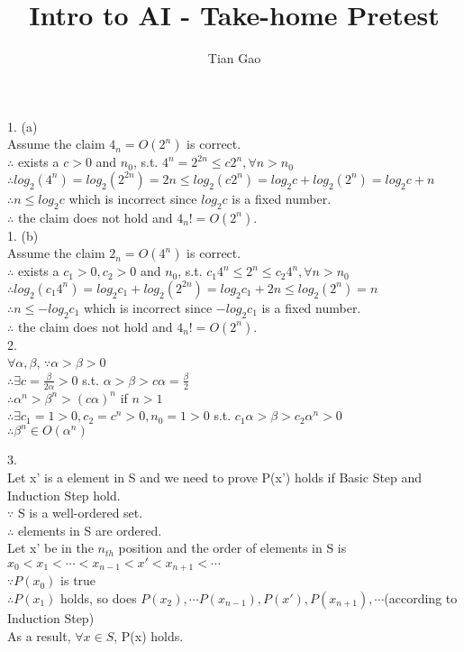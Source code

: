 \documentclass[a4paper]{article}
\title{Intro to AI - Take-home Pretest}
\author{Tian Gao}
\begin{document}
\maketitle


1. (a)\\
Assume the claim $4_n=O(2^n)$ is correct. \\
$\therefore$ exists a $c>0$ and $n_0$, s.t. $4^n = 2^{2n} \leqslant c  2^n, \forall n>n_0$\\
$\therefore log_2(4^{n}) = log_2(2^{2n})=2n \leqslant log_2(c  2^n) = log_2c + log_2(2^{n}) = log_2c + n$ \\
$\therefore n \leqslant log_2c$ which is incorrect since $log_2c$ is a fixed number.\\
$\therefore$ the claim does not hold and $4_n!=O(2^n)$.\\

1. (b)\\
Assume the claim $2_n=O(4^n)$ is correct. \\
$\therefore$ exists a $c_1>0, c_2>0$ and $n_0$, s.t. $c_1 4^n \leqslant 2^n \leqslant c_2  4^n , \forall n>n_0$\\
$\therefore log_2(c_1  4^n) = log_2c_1 + log_2(2^{2n}) = log_2c_1 + 2n \leqslant log_2(2^{n}) = n$ \\
$\therefore n \leqslant -log_2c_1$ which is incorrect since $-log_2c_1$ is a fixed number.\\
$\therefore$ the claim does not hold and $4_n!=O(2^n)$.\\

2. \\
$\forall \alpha, \beta$, $\because \alpha > \beta > 0$\\
$\therefore \exists c=\frac{\beta}{2\alpha}>0$ s.t. $\alpha > \beta > c\alpha=\frac{\beta}{2}$\\
$\therefore \alpha^n > \beta^n > (c\alpha)^n$ if $n > 1$\\
$\therefore \exists c_1=1>0, c_2=c^n>0, n_0=1>0$ s.t. $c_1\alpha > \beta > c_2\alpha^n>0$\\
$\therefore \beta^n \in O(\alpha^n)$

3. \\
Let x' is a element in S and we need to prove P(x') holds if Basic Step and Induction Step hold.\\
$\because $ S is a well-ordered set.\\
$\therefore$ elements in S are ordered.\\
Let x' be in the $n_{th}$ position and the order of elements in S is $x_0 < x_1 < \dotsb < x_{n-1} < x' < x_{n+1} < \dotsb$\\
$\because P(x_0)$ is true\\
$\therefore P(x_1)$ holds, so does $P(x_2), \dotsb P(x_{n-1}), P(x'), P(x_{n+1}), \dotsb$(according to Induction Step)\\
As a result, $\forall x \in S$, P(x) holds.\\
\end{document}
